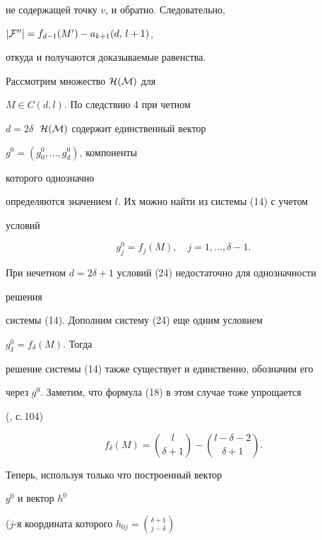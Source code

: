не содержащей точку $v$, и обратно. Следовательно,


$|{\cal F''}|=f_{d-1}(M')-a_{k+1}(d,\,l+1)$,


откуда и получаются доказываемые равенства.













Рассмотрим множество $\cal H(M)$ для


$M\in C(d,l)$. По следствию 4 при четном


$d=2\delta\;$ $\cal H(M)$ содержит единственный вектор


$g^0=(g^0_0,\dotsc,g^0_d)$, компоненты


которого однозначно


определяются значением $l$. Их можно найти из системы (14) с учетом


условий


\begin{equation}


g^0_j=f_j(M),\quad j=1,\dotsc,\delta-1.


\end{equation}


При нечетном $d=2\delta+1$ условий (24) недостаточно для однозначности


решения


системы (14). Дополним систему (24) еще одним условием


$g^0_\delta=f_\delta(M)$. Тогда


решение системы (14) также существует и единственно, обозначим его


через $g^0$. Заметим, что формула (18) в этом случае тоже упрощается


(\cite{Em}, с.\,104)


\begin{equation}


f_\delta(M)=\binom{l}{\delta+1}-


\binom{l-\delta-2}{\delta+1}.


\end{equation}





Теперь, используя только что построенный вектор


$g^0$ и вектор $h^0$


($j$-я координата которого $h_{0j}=\binom{\delta+1}{j-\delta}$


